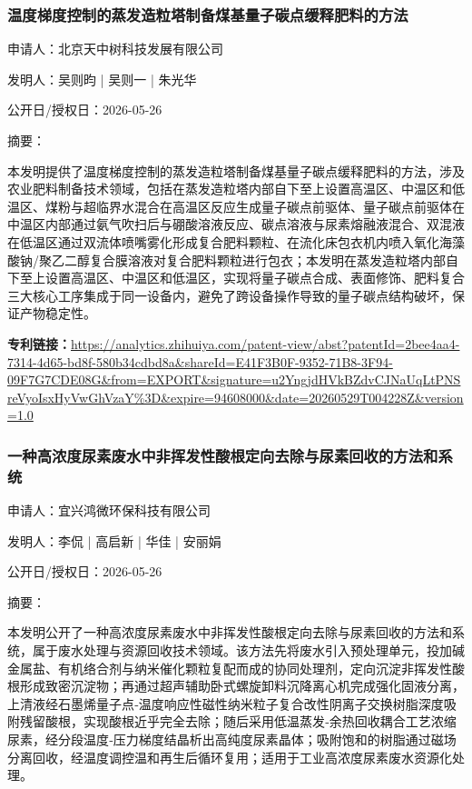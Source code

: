 \documentclass[12pt,a4paper]{ctexart}
\begin{document}
\subsubsection{ 温度梯度控制的蒸发造粒塔制备煤基量子碳点缓释肥料的方法 }

申请人：北京天中树科技发展有限公司

发明人：吴则昀 | 吴则一 | 朱光华

公开日/授权日：2026-05-26

摘要：

本发明提供了温度梯度控制的蒸发造粒塔制备煤基量子碳点缓释肥料的方法，涉及农业肥料制备技术领域，包括在蒸发造粒塔内部自下至上设置高温区、中温区和低温区、煤粉与超临界水混合在高温区反应生成量子碳点前驱体、量子碳点前驱体在中温区内部通过氨气吹扫后与硼酸溶液反应、碳点溶液与尿素熔融液混合、双混液在低温区通过双流体喷嘴雾化形成复合肥料颗粒、在流化床包衣机内喷入氧化海藻酸钠/聚乙二醇复合膜溶液对复合肥料颗粒进行包衣；本发明在蒸发造粒塔内部自下至上设置高温区、中温区和低温区，实现将量子碳点合成、表面修饰、肥料复合三大核心工序集成于同一设备内，避免了跨设备操作导致的量子碳点结构破坏，保证产物稳定性。

\noindent\textbf{专利链接：}\url{https://analytics.zhihuiya.com/patent-view/abst?patentId=2bee4aa4-7314-4d65-bd8f-580b34cdbd8a&shareId=E41F3B0F-9352-71B8-3F94-09F7G7CDE08G&from=EXPORT&signature=u2YngjdHVkBZdvCJNaUqLtPNSreVyoIsxHyVwGhVzaY%3D&expire=94608000&date=20260529T004228Z&version=1.0}

\subsubsection{ 一种高浓度尿素废水中非挥发性酸根定向去除与尿素回收的方法和系统 }

申请人：宜兴鸿微环保科技有限公司

发明人：李侃 | 高启新 | 华佳 | 安丽娟

公开日/授权日：2026-05-26

摘要：

本发明公开了一种高浓度尿素废水中非挥发性酸根定向去除与尿素回收的方法和系统，属于废水处理与资源回收技术领域。该方法先将废水引入预处理单元，投加碱金属盐、有机络合剂与纳米催化颗粒复配而成的协同处理剂，定向沉淀非挥发性酸根形成致密沉淀物；再通过超声辅助卧式螺旋卸料沉降离心机完成强化固液分离，上清液经石墨烯量子点‑温度响应性磁性纳米粒子复合改性阴离子交换树脂深度吸附残留酸根，实现酸根近乎完全去除；随后采用低温蒸发‑余热回收耦合工艺浓缩尿素，经分段温度‑压力梯度结晶析出高纯度尿素晶体；吸附饱和的树脂通过磁场分离回收，经温度调控温和再生后循环复用；适用于工业高浓度尿素废水资源化处理。
\end{document}
